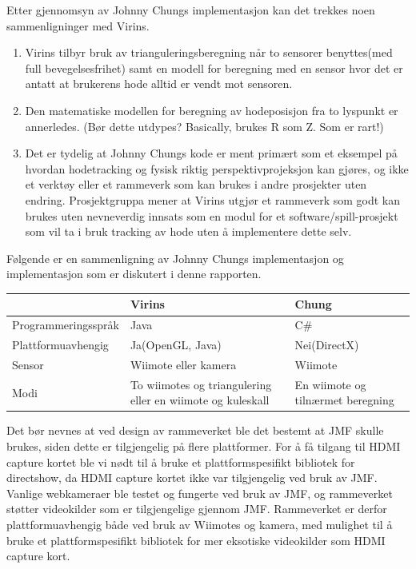 \documentclass{report}
\begin{document}
Etter gjennomsyn av Johnny Chungs implementasjon kan det trekkes noen sammenligninger med Virins.
\begin{enumerate}
\item Virins tilbyr bruk av trianguleringsberegning når to sensorer benyttes(med full bevegelsesfrihet) samt en modell for beregning med en sensor hvor det er antatt at brukerens hode alltid er vendt mot sensoren.
\item Den matematiske modellen for beregning av hodeposisjon fra to lyspunkt er annerledes. (Bør dette utdypes? Basically, brukes R som Z. Som er rart!)
\item Det er tydelig at Johnny Chungs kode er ment primært som et eksempel på hvordan hodetracking og fysisk riktig perspektivprojeksjon
kan gjøres, og ikke et verktøy eller et rammeverk som kan brukes i andre prosjekter uten endring. Prosjektgruppa mener at Virins utgjør et rammeverk som godt kan brukes uten nevneverdig innsats som en modul for et software/spill-prosjekt som vil ta i bruk tracking av hode uten å implementere dette selv.
\end{enumerate}
Følgende er en sammenligning av Johnny Chungs implementasjon og implementasjon som er diskutert i denne rapporten.

\begin{tabular}{| l | p{4cm} | p{4cm} | }
\hline			
                        & \textbf{Virins}                                               & \textbf{Chung} \\
\hline
  Programmeringsspråk   & Java                                                          & C\# \\
\hline
  Plattformuavhengig    & Ja(OpenGL, Java)                                              & Nei(DirectX) \\
\hline
  Sensor                & Wiimote eller kamera                                          & Wiimote \\
\hline
  Modi                  & To wiimotes og triangulering eller en wiimote og kuleskall    & En wiimote og tilnærmet beregning \\
\hline  
\end{tabular}

Det bør nevnes at ved design av rammeverket ble det bestemt at JMF skulle brukes, siden dette er tilgjengelig på flere plattformer.
For å få tilgang til HDMI capture kortet ble vi nødt til å bruke et plattformspesifikt bibliotek for directshow, da HDMI capture kortet ikke var tilgjengelig ved bruk av JMF. Vanlige webkameraer ble testet og fungerte ved bruk av JMF, og rammeverket støtter
videokilder som er tilgjengelige gjennom JMF.  Rammeverket er derfor plattformuavhengig både ved bruk av Wiimotes og kamera, med mulighet til
å bruke et plattformspesifikt bibliotek for mer eksotiske videokilder som HDMI capture kort.
\end{document}
